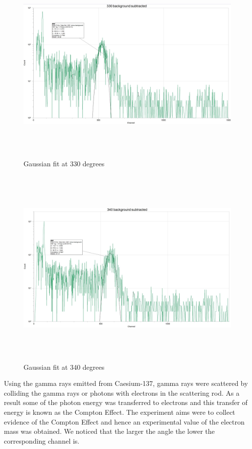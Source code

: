 \documentclass[fleqn]{article}
\begin{document}
  \begin{figure}[htbp]
    \includegraphics[height=10cm, width=18cm]{Ten.JPG}
    \caption{
      Gaussian fit at 330 degrees
    }
  \end{figure}

  \pagebreak

  \begin{figure}[htbp]
    \includegraphics[height=10cm, width=18cm]{Eleven.JPG}
    \caption{
      Gaussian fit at 340 degrees
    }
  \end{figure}

  Using the gamma rays emitted from Caesium-137, gamma rays were scattered by colliding the gamma rays or photons with electrons 
  in the scattering rod. As a result some of the photon energy was transferred to electrons and this transfer of energy is known 
  as the Compton Effect. The experiment aims were to collect evidence of the Compton Effect and hence an experimental value of the 
  electron mass was obtained. We noticed that the larger the angle the lower the corresponding channel is.  
  
\end{document}
